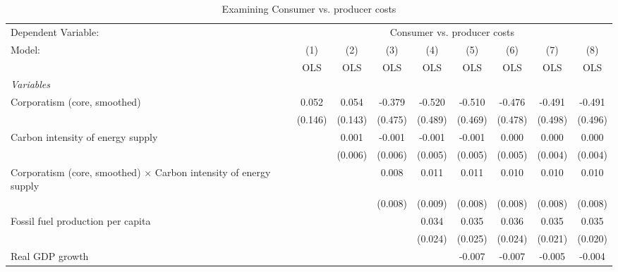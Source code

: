 
\begin{table}[htbp]
   \caption{Examining Consumer vs. producer costs}
   \centering
   \begin{tabular}{lcccccccc}
      \toprule
      Dependent Variable: & \multicolumn{8}{c}{Consumer vs. producer costs}\\
      Model:                                                                   & (1)     & (2)     & (3)     & (4)     & (5)     & (6)     & (7)     & (8)\\  
                                                                               &  OLS    & OLS     & OLS     & OLS     & OLS     & OLS     & OLS     & OLS\\  
      \midrule
      \emph{Variables}\\
      Corporatism (core, smoothed)                                             & 0.052   & 0.054   & -0.379  & -0.520  & -0.510  & -0.476  & -0.491  & -0.491\\   
                                                                               & (0.146) & (0.143) & (0.475) & (0.489) & (0.469) & (0.478) & (0.498) & (0.496)\\   
      Carbon intensity of energy supply                                        &         & 0.001   & -0.001  & -0.001  & -0.001  & 0.000   & 0.000   & 0.000\\   
                                                                               &         & (0.006) & (0.006) & (0.005) & (0.005) & (0.005) & (0.004) & (0.004)\\   
      Corporatism (core, smoothed) $\times$ Carbon intensity of energy supply  &         &         & 0.008   & 0.011   & 0.011   & 0.010   & 0.010   & 0.010\\   
                                                                               &         &         & (0.008) & (0.009) & (0.008) & (0.008) & (0.008) & (0.008)\\   
      Fossil fuel production per capita                                        &         &         &         & 0.034   & 0.035   & 0.036   & 0.035   & 0.035\\   
                                                                               &         &         &         & (0.024) & (0.025) & (0.024) & (0.021) & (0.020)\\   
      Real GDP growth                                                          &         &         &         &         & -0.007  & -0.007  & -0.005  & -0.004\\   

\end{tabular}
\end{table}
